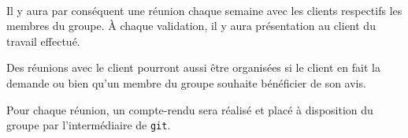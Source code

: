 \documentclass[a4paper,11pt,french]{article}
\begin{document}
\paragraph{}
Il y aura par conséquent une réunion chaque semaine avec les clients respectifs
les membres du groupe. À chaque validation, il y aura présentation au client du 
travail effectué.

Des réunions avec le client pourront aussi être organisées si le client en fait
la demande ou bien qu'un membre du groupe souhaite bénéficier de son avis.

Pour chaque réunion, un compte-rendu sera réalisé et placé à disposition du
groupe par l'intermédiaire de \texttt{git}.
\end{document}
